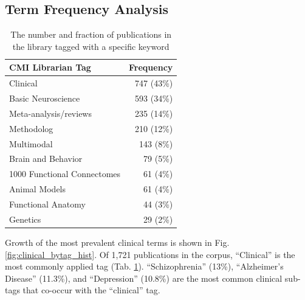 \documentclass[5p]{elsarticle}
\begin{document}
\subsection{Term Frequency Analysis}

\begin{table}[H]
\caption{\label{tagfreqtable} The number and fraction of publications in the
library tagged with a specific keyword}
\begin{center}
\begin{tabular}{|l|r|}
\hline
{\bf CMI Librarian Tag}&{\bf Frequency} \\ \hline \hline
Clinical & 747 (43\%) \\ \hline
Basic Neuroscience&593 (34\%) \\ \hline
Meta-analysis/reviews&235 (14\%) \\ \hline
Methodolog&210 (12\%) \\ \hline
Multimodal&143 (8\%) \\ \hline
Brain and Behavior&79 (5\%) \\ \hline
1000 Functional Connectomes&61 (4\%) \\ \hline
Animal Models&61 (4\%) \\ \hline
Functional Anatomy&44 (3\%) \\ \hline
Genetics&29 (2\%) \\ \hline
\end{tabular}
\end{center}
\end{table}


Growth of the most prevalent clinical terms is shown in Fig.
\ref{fig:clinical_bytag_hist}. Of 1,721
publications in the corpus, ``Clinical'' is the most commonly applied tag
(Tab. \ref{tagfreqtable}). ``Schizophrenia'' (13\%), ``Alzheimer's Disease'' (11.3\%),
and ``Depression'' (10.8\%) are the most common clinical sub-tags that co-occur with the
``clinical'' tag.
\end{document}
